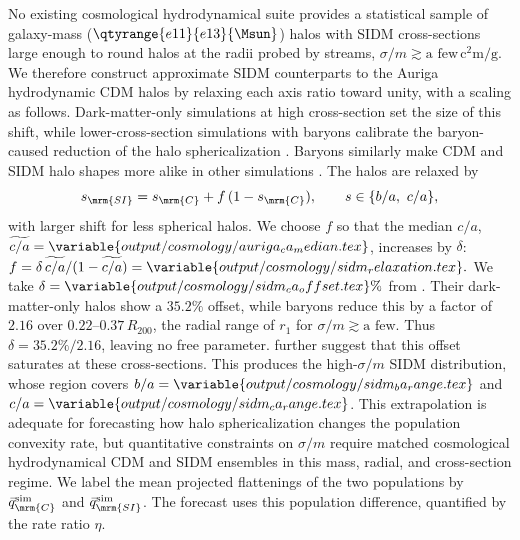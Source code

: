 \documentclass[linenumbers,twocolumn]{aastex701}
\begin{document}
        No existing cosmological hydrodynamical suite provides a statistical sample of galaxy-mass ($\qtyrange{e11}{e13}{\Msun}$) halos with \gls{SIDM} cross-sections large enough to round halos at the radii probed by streams, $\sigma/m\gtrsim\text{a few}\,\unit{\square\centi\meter\per\gram}$. %
        We therefore construct approximate \gls{SIDM} counterparts to the Auriga hydrodynamic \gls{CDM} halos by relaxing each axis ratio toward unity, with a scaling as follows. %
        Dark-matter-only simulations at high cross-section set the size of this shift, while lower-cross-section simulations with baryons calibrate the baryon-caused reduction of the halo sphericalization \citep{Giocoli+:2026:AIDATNGProject3D}. %
        Baryons similarly make \gls{CDM} and \gls{SIDM} halo shapes more alike in other simulations \citep{Despali+:2022:ConstrainingSIDMHalo,Vargya+:2022:ShapesMilkyWayMassGalaxies}. %
        The halos are relaxed by
        \begin{equation}\label{eq:cosmology:sidm_relaxation}
            s_{\mrm{SI}} = s_{\mrm{C}} + f\,(1 - s_{\mrm{C}}), \qquad s \in \{b/a,\ c/a\}, %
        \end{equation}
        with larger shift for less spherical halos. %
        We choose $f$ so that the median $c/a$, $\widetilde{c/a}=\variable{output/cosmology/auriga_ca_median.tex}$, increases by $\delta$: $f=\delta\,\widetilde{c/a}/(1-\widetilde{c/a}) =\variable{output/cosmology/sidm_relaxation.tex}.$ %
        We take $\delta=\variable{output/cosmology/sidm_ca_offset.tex}\%$ from \citet{Giocoli+:2026:AIDATNGProject3D}. %
        Their dark-matter-only halos show a $35.2\%$ offset, while baryons reduce this by a factor of $2.16$ over $\numrange{0.22}{0.37}\,R_{200}$, the radial range of $r_1$ for $\sigma/m\gtrsim\text{a few}$. %
        Thus $\delta=35.2\%/2.16$, leaving no free parameter. %
        \citet{Chua+:2021:ImpactInelasticSelfinteracting} further suggest that this offset saturates at these cross-sections. %
        This produces the high-$\sigma/m$ \gls{SIDM} distribution, whose region covers $b/a=\variable{output/cosmology/sidm_ba_range.tex}$ and $c/a=\variable{output/cosmology/sidm_ca_range.tex}$. %
        This extrapolation is adequate for forecasting how halo sphericalization changes the population convexity rate, but quantitative constraints on $\sigma/m$ require matched cosmological hydrodynamical \gls{CDM} and \gls{SIDM} ensembles in this mass, radial, and cross-section regime. %
        We label the mean projected flattenings of the two populations by $\bar{q}_{\mrm{C}}^{\rm sim}$ and $\bar{q}_{\mrm{SI}}^{\rm sim}$. %
        The forecast uses this population difference, quantified by the rate ratio $\eta$. %
\end{document}
